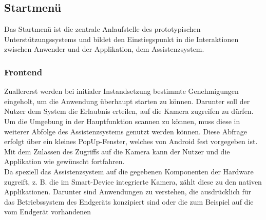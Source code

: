 \subsection{Startmenü}
Das Startmenü ist die zentrale Anlaufstelle des prototypischen Unterstützungssystems und bildet den Einstiegspunkt in die Interaktionen zwischen Anwender 
und der Applikation, dem Assistenzsystem.
\subsubsection{Frontend}
Zuallererst werden bei initialer Instandsetzung bestimmte Genehmigungen eingeholt, um die Anwendung überhaupt starten zu können. Darunter soll der Nutzer dem System 
die Erlaubnis erteilen, auf die Kamera zugreifen zu dürfen. Um die Umgebung in der Hauptfunktion scannen zu können, muss diese in weiterer Abfolge des Assistenzsystems genutzt werden können. 
Diese Abfrage erfolgt über ein kleines PopUp-Fenster, welches von Android fest vorgegeben ist. %
Mit dem Zulassen des Zugriffs auf die Kamera kann der Nutzer und die Applikation wie gewünscht fortfahren. %
\\ 
\linebreak
Da speziell das Assistenzsystem auf die gegebenen Komponenten der Hardware zugreift, z. B. die im Smart-Device integrierte Kamera, zählt diese zu den nativen Applikationen. 
Darunter sind Anwendungen zu verstehen, die ausdrücklich für das Betriebssystem des Endgeräts konzipiert sind oder die zum Beispiel auf die vom Endgerät vorhandenen 

